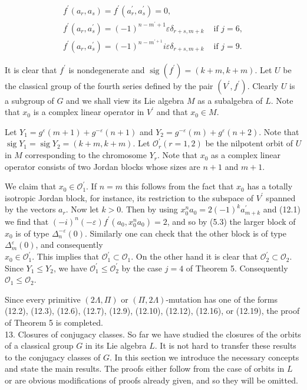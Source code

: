 \documentclass[10pt]{article}
\begin{document}
$$
\begin{array}{ll}
f^{\prime}\left(a_{r}, a_{s}\right)=f^{\prime}\left(a_{r}^{\prime}, a_{s}^{\prime}\right)=0, & \\
f^{\prime}\left(a_{r}, a_{s}^{\prime}\right)=(-1)^{n-m^{\prime}+1} \varepsilon \delta_{r+s, m+k} & \text { if } j=6, \\
f^{\prime}\left(a_{r}, a_{s}^{\prime}\right)=(-1)^{n-m^{\prime+1}} i \varepsilon \delta_{r+s, m+k} & \text { if } j=9 .
\end{array}
$$

It is clear that $f^{\prime}$ is nondegenerate and $\operatorname{sig}\left(f^{\prime}\right)=(k+m, k+m)$. Let $U$ be the classical group of the fourth series defined by the pair $\left(V^{\prime}, f^{\prime}\right)$. Clearly $U$ is a subgroup of $G$ and we shall view its Lie algebra $M$ as a subalgebra of $L$. Note that $x_{0}$ is a complex linear operator in $V^{\prime}$ and that $x_{0} \in M$.

Let $Y_{1}=g^{\varepsilon}(m+1)+g^{-\varepsilon}(n+1)$ and $Y_{2}=g^{-\varepsilon}(m)+g^{\varepsilon}(n+2)$. Note that $\operatorname{sig} Y_{1}=\operatorname{sig} Y_{2}=(k+m, k+m)$. Let $\mathcal{O}_{r}^{\prime}(r=1,2)$ be the nilpotent orbit of $U$ in $M$ corresponding to the chromosome $Y_{r}$. Note that $x_{0}$ as a complex linear operator consists of two Jordan blocks whose sizes are $n+1$ and $m+1$.

We claim that $x_{0} \in \mathcal{O}_{1}^{\prime}$. If $n=m$ this follows from the fact that $x_{0}$ has a totally isotropic Jordan block, for instance, its restriction to the subspace of $V^{\prime}$ spanned by the vectors $a_{r}$. Now let $k>0$. Then by using $x_{0}^{n} a_{0}=2(-1)^{k} a_{m+k}^{\prime}$ and (12.1) we find that $(-i)^{n}(-\varepsilon) f^{\prime}\left(a_{0}, x_{0}^{n} a_{0}\right)=2$, and so by (5.3) the larger block of $x_{0}$ is of type $\Delta_{n}^{-\varepsilon}(0)$. Similarly one can check that the other block is of type $\Delta_{m}^{\varepsilon}(0)$, and consequently\\
$x_{0} \in \mathcal{O}_{1}^{\prime}$. This implies that $\mathcal{O}_{1}^{\prime} \subset \mathcal{O}_{1}$. On the other hand it is clear that $\mathcal{O}_{2}^{\prime} \subset \mathcal{O}_{2}$. Since $Y_{1} \leqslant Y_{2}$, we have $\mathcal{O}_{1}^{\prime} \leqslant \mathcal{O}_{2}^{\prime}$ by the case $j=4$ of Theorem 5. Consequently $\mathcal{O}_{1} \leqslant \mathcal{O}_{2}$.

Since every primitive $(2 \Lambda, \Pi)$ or $(\Pi, 2 \Lambda)$-mutation has one of the forms (12.2), (12.3), (12.6), (12.7), (12.9), (12.10), (12.12), (12.16), or (12.19), the proof of Theorem 5 is completed.\\
13. Closures of conjugacy classes. So far we have studied the closures of the orbits of a classical group $G$ in its Lie algebra $L$. It is not hard to transfer these results to the conjugacy classes of $G$. In this section we introduce the necessary concepts and state the main results. The proofs either follow from the case of orbits in $L$ or are obvious modifications of proofs already given, and so they will be omitted.
\end{document}
